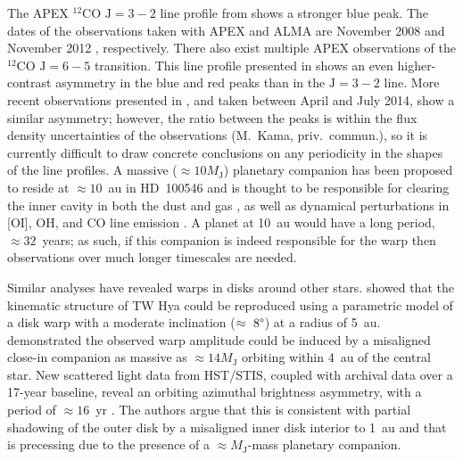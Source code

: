 \documentclass[onecolumn]{aastex6}
\begin{document}
The APEX $^{12}$CO $\mathrm{J}=3-2$ line profile from \citet{panic10} shows a
stronger blue peak. The dates of the observations taken with APEX and ALMA are
November 2008 \citep[][]{panic10} and November 2012 \citep[][]{walsh14},
respectively. There also exist multiple APEX observations of the $^{12}$CO
$\mathrm{J}=6-5$ transition. This line profile presented in \citep{panic10}
shows an even higher-contrast asymmetry in the blue and red peaks than in the
$\mathrm{J}=3-2$ line. More recent observations presented in \citet{kama16}, and
taken between April and July 2014, show a similar asymmetry; however, the ratio
between the peaks is within the flux density uncertainties of the observations
(M.~Kama, priv.~commun.), so it is currently difficult to draw concrete
conclusions on any periodicity in the shapes of the line profiles. A massive
($\approx 10 M_\mathrm{J}$) planetary companion has been proposed to reside at
$\approx 10$~au in HD~100546 and is thought to be responsible for clearing the
inner cavity in both the dust and gas
\citep{mulders13,panic14,walsh14,pinilla15,wright15,garufi16}, as well as
dynamical perturbations in [OI], OH, and CO line emission
\citep{acke06,vanderplas09,brittain14}. A planet at 10~au would have a long
period, $\approx 32$~years; as such, if this companion is indeed responsible for
the warp then observations over much longer timescales are needed.

Similar analyses have revealed warps in disks around other stars.
\citet{rosenfeld12} showed that the kinematic structure of TW Hya
could be reproduced using a parametric model of a disk warp
with a moderate inclination ($\approx~8\degree$) at a radius of 5~au.
\citet{facchini14} demonstrated the observed warp amplitude
could be induced by a misaligned close-in companion as massive as
$\approx 14M_\mathrm{J}$ orbiting within 4~au of the central star.
New scattered light data from HST/STIS, coupled with
archival data over a 17-year baseline, reveal an orbiting
azimuthal brightness asymmetry, with a
period of $\approx 16$~yr \citep{debes17}.
The authors argue that this is consistent with partial
shadowing of the outer disk by a misaligned inner
disk interior to 1~au and that is precessing due to
the presence of a $\approx M_\mathrm{J}$-mass planetary companion.
\end{document}
